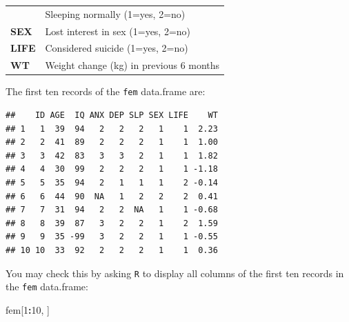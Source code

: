 \documentclass[]{book}
\newenvironment{Shaded}{\begin{snugshade}}{\end{snugshade}}
\newcommand{\DecValTok}[1]{\textcolor[rgb]{0.00,0.00,0.81}{#1}}
\newcommand{\OperatorTok}[1]{\textcolor[rgb]{0.81,0.36,0.00}{\textbf{#1}}}
\newcommand{\NormalTok}[1]{#1}
\theoremstyle{definition}
\theoremstyle{definition}
\theoremstyle{definition}
\theoremstyle{remark}
\begin{document}
\begin{longtable}[]{@{}ll@{}}
\begin{minipage}[t]{0.14\columnwidth}
\end{minipage} & \begin{minipage}[t]{0.69\columnwidth}\raggedright
Sleeping normally (1=yes, 2=no)\strut
\end{minipage}\tabularnewline
\begin{minipage}[t]{0.14\columnwidth}\raggedright
\textbf{SEX}\strut
\end{minipage} & \begin{minipage}[t]{0.69\columnwidth}\raggedright
Lost interest in sex (1=yes, 2=no)\strut
\end{minipage}\tabularnewline
\begin{minipage}[t]{0.14\columnwidth}\raggedright
\textbf{LIFE}\strut
\end{minipage} & \begin{minipage}[t]{0.69\columnwidth}\raggedright
Considered suicide (1=yes, 2=no)\strut
\end{minipage}\tabularnewline
\begin{minipage}[t]{0.14\columnwidth}\raggedright
\textbf{WT}\strut
\end{minipage} & \begin{minipage}[t]{0.69\columnwidth}\raggedright
Weight change (kg) in previous 6 months\strut
\end{minipage}\tabularnewline
\bottomrule
\end{longtable}

The first ten records of the \texttt{fem} data.frame are:

\begin{verbatim}
##    ID AGE  IQ ANX DEP SLP SEX LIFE    WT
## 1   1  39  94   2   2   2   1    1  2.23
## 2   2  41  89   2   2   2   1    1  1.00
## 3   3  42  83   3   3   2   1    1  1.82
## 4   4  30  99   2   2   2   1    1 -1.18
## 5   5  35  94   2   1   1   1    2 -0.14
## 6   6  44  90  NA   1   2   2    2  0.41
## 7   7  31  94   2   2  NA   1    1 -0.68
## 8   8  39  87   3   2   2   1    2  1.59
## 9   9  35 -99   3   2   2   1    1 -0.55
## 10 10  33  92   2   2   2   1    1  0.36
\end{verbatim}

You may check this by asking \texttt{R} to display all columns of the
first ten records in the \texttt{fem} data.frame:

\begin{Shaded}
\begin{Highlighting}[]
\NormalTok{fem[}\DecValTok{1}\OperatorTok{:}\DecValTok{10}\NormalTok{, ]}
\end{Highlighting}
\end{Shaded}
\end{document}
